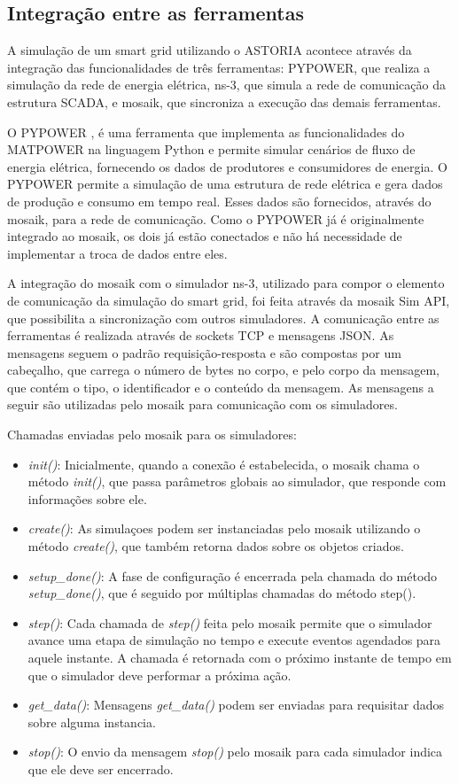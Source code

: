 \documentclass[cic,tc]{iiufrgs}
\begin{document}
\subsection{Integração entre as ferramentas}
\label{subsecinteg}
 
A simulação de um smart grid utilizando o ASTORIA acontece através da integração das funcionalidades de três ferramentas: PYPOWER, que realiza a simulação da rede de energia elétrica, ns-3, que simula a rede de comunicação da estrutura SCADA, e mosaik, que sincroniza a execução das demais ferramentas.
 
O PYPOWER \cite{pypower},  é uma ferramenta que implementa as funcionalidades do MATPOWER \cite{matpower} na linguagem Python e permite simular cenários de fluxo de energia elétrica, fornecendo os dados de produtores e consumidores de energia. O PYPOWER permite a simulação de uma estrutura de rede elétrica e gera dados de produção e consumo em tempo real. Esses dados são fornecidos, através do mosaik, para a rede de comunicação. Como o PYPOWER já é originalmente integrado ao mosaik, os dois já estão conectados e não há necessidade de implementar a troca de dados entre eles.
 
A integração do mosaik com o simulador ns-3, utilizado para compor o elemento de comunicação da simulação do smart grid, foi feita através da mosaik Sim API, que possibilita a sincronização com outros simuladores. A comunicação entre as ferramentas é realizada através de sockets TCP e mensagens JSON. As mensagens seguem o padrão requisição-resposta e são compostas por um cabeçalho, que carrega o número de bytes no corpo, e pelo corpo da mensagem, que contém o tipo, o identificador e o conteúdo da mensagem. As mensagens a seguir são utilizadas pelo mosaik para comunicação com os simuladores.
 
Chamadas enviadas pelo mosaik para os simuladores:
 
\begin{itemize}
\item \emph{init()}: Inicialmente, quando a conexão é estabelecida, o mosaik chama o método \emph{init()}, que passa parâmetros globais ao simulador, que responde com informações sobre ele.
\item \emph{create()}: As simulaçoes podem ser instanciadas pelo mosaik utilizando o método \emph{create()}, que também retorna dados sobre os objetos criados.
\item \emph{setup_done()}: A fase de configuração é encerrada pela chamada do método \emph{setup_done()}, que é seguido por múltiplas chamadas do método step().
\item \emph{step()}: Cada chamada de \emph{step()} feita pelo mosaik permite que o simulador avance uma etapa de simulação no tempo e execute eventos agendados para aquele instante. A chamada é retornada com o próximo instante de tempo em que o simulador deve performar a próxima ação.
\item \emph{get_data()}: Mensagens \emph{get_data()} podem ser enviadas para requisitar dados sobre alguma instancia.
\item \emph{stop()}: O envio da mensagem \emph{stop()} pelo mosaik para cada simulador indica que ele deve ser encerrado.
\end{itemize}
\end{document}
